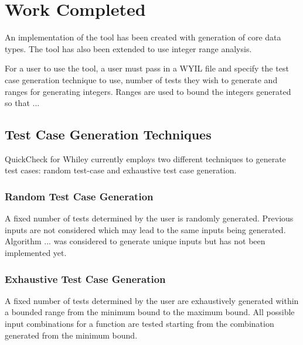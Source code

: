 \chapter{Work Completed}\label{chapter:work}



An implementation of the tool has been created with generation of core data types. The tool has also been extended to use integer range analysis.

For a user to use the tool, a user must pass in a WYIL file and specify the test case generation technique to use, number of tests they wish to generate and ranges for generating integers.
Ranges are used to bound the integers generated so that ...

\section{Test Case Generation Techniques}

QuickCheck for Whiley currently employs two different techniques to generate test cases: random test-case and exhaustive test case generation.

\subsection{Random Test Case Generation}

A fixed number of tests determined by the user is randomly generated. Previous inputs are not considered which may lead to the same inputs being generated. 
Algorithm ... was considered to generate unique inputs but has not been implemented yet.

\subsection{Exhaustive Test Case Generation}
A fixed number of tests determined by the user are exhaustively generated within a bounded range from the minimum bound to the maximum bound. All possible input combinations for a function are tested starting from the combination generated from the minimum bound.

